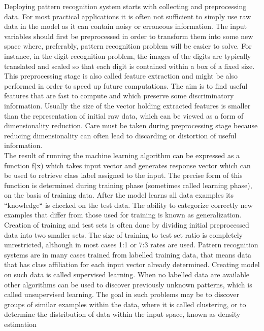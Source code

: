 Deploying pattern recognition system starts with collecting and preprocessing data. For most practical applications it is often not sufficient to simply use raw data in the model as it can contain noisy or erroneous information. The input variables should first be preprocessed in order to transform them into some new space where, preferably, pattern recognition problem will be easier to solve. For instance, in the digit recognition problem, the images of the digits are typically translated and scaled so that each
digit is contained within a box of a fixed size. This preprocessing stage is also called feature extraction and might be also performed in order to speed up future computations. The aim is to find useful features that are fast to compute and which preserve some discriminatory information. Usually the size of the vector holding extracted features is smaller than the representation of initial raw data, which can be viewed as a form of dimensionality reduction. Care must be taken during preprocessing stage because reducing dimensionality can often lead to discarding or distortion of useful information. \\

The result of running the machine learning algorithm can be expressed as a function f(x) which takes input vector and generates response vector which can be used to retrieve class label assigned to the input. The precise form of this function is determined during training phase (sometimes called learning phase), on the basis of training data. After the model learns all data examples its ``knowledge`` is checked on the test data. The ability to categorize correctly new examples that differ from those used for training is known as generalization. Creation of training and test sets is often done by dividing initial preprocessed data into two smaller sets. The size of training to test set ratio is completely unrestricted, although in most cases 1:1 or 7:3 rates are used. Pattern recognition systems are in many cases trained from labelled training data, that means data that has class affiliation for each input vector already determined. Creating model on such data is called supervised learning. When no labelled data are available other algorithms can be used to discover previously unknown patterns, which is called unsupervised learning. The goal in such problems may be to discover groups of similar examples within the data, where it is called clustering, or to determine the distribution of data within the input space, known as density estimation \\